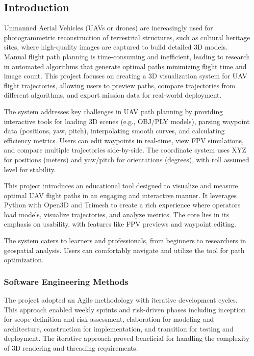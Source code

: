 \documentclass[11pt,a4paper]{article}
\begin{document}
\subsection{Introduction}
\label{ss:introduction}

Unmanned Aerial Vehicles (UAVs or drones) are increasingly used for photogrammetric reconstruction of terrestrial structures, such as cultural heritage sites, where high-quality images are captured to build detailed 3D models. Manual flight path planning is time-consuming and inefficient, leading to research in automated algorithms that generate optimal paths minimizing flight time and image count. This project focuses on creating a 3D visualization system for UAV flight trajectories, allowing users to preview paths, compare trajectories from different algorithms, and export mission data for real-world deployment.

The system addresses key challenges in UAV path planning by providing interactive tools for loading 3D scenes (e.g., OBJ/PLY models), parsing waypoint data (positions, yaw, pitch), interpolating smooth curves, and calculating efficiency metrics. Users can edit waypoints in real-time, view FPV simulations, and compare multiple trajectories side-by-side. The coordinate system uses XYZ for positions (meters) and yaw/pitch for orientations (degrees), with roll assumed level for stability.

This project introduces an educational tool designed to visualize and measure optimal UAV flight paths in an engaging and interactive manner. It leverages Python with Open3D and Trimesh to create a rich experience where operators load models, visualize trajectories, and analyze metrics. The core lies in its emphasis on usability, with features like FPV previews and waypoint editing.

The system caters to learners and professionals, from beginners to researchers in geospatial analysis. Users can comfortably navigate and utilize the tool for path optimization.

\subsubsection{Software Engineering Methods}

The project adopted an Agile methodology with iterative development cycles. This approach enabled weekly sprints and risk-driven phases including inception for scope definition and risk assessment, elaboration for modeling and architecture, construction for implementation, and transition for testing and deployment. The iterative approach proved beneficial for handling the complexity of 3D rendering and threading requirements.
\end{document}
